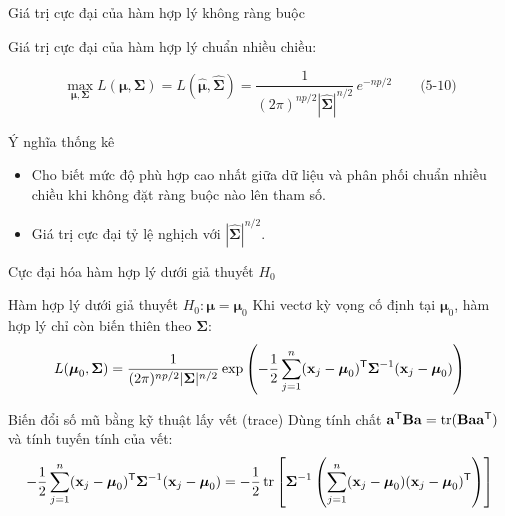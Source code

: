 \begin{frame}{Giá trị cực đại của hàm hợp lý không ràng buộc}

  \begin{alertblock}{Giá trị cực đại của hàm hợp lý chuẩn nhiều chiều:}

    \[
      \max_{\boldsymbol{\mu}, \boldsymbol{\Sigma}}
      L(\boldsymbol{\mu}, \boldsymbol{\Sigma})
      =
      L(\hat{\boldsymbol{\mu}}, \hat{\boldsymbol{\Sigma}})
      =
      \frac{1}{(2\pi)^{np/2} |\hat{\boldsymbol{\Sigma}}|^{n/2}}
      \, e^{-np/2}
      \qquad \text{(5-10)}
    \]

  \end{alertblock}

  \begin{block}{Ý nghĩa thống kê}
    \begin{itemize}
      \item Cho biết mức độ phù hợp cao nhất giữa dữ liệu và phân phối chuẩn nhiều chiều khi không đặt ràng buộc nào lên tham số.
      \item Giá trị cực đại tỷ lệ nghịch với $|\hat{\boldsymbol{\Sigma}}|^{n/2}$.
    \end{itemize}
  \end{block}
\end{frame}

\begin{frame}{Cực đại hóa hàm hợp lý dưới giả thuyết \texorpdfstring{$H_0$}{H0}}
  \begin{block}{Hàm hợp lý dưới giả thuyết $H_0: \boldsymbol{\mu} = \boldsymbol{\mu}_0$}
    Khi vectơ kỳ vọng cố định tại $\boldsymbol{\mu}_0$, hàm hợp lý chỉ còn biến thiên theo $\boldsymbol{\Sigma}$:
    \[
      L(\boldsymbol{\mu}_0, \boldsymbol{\Sigma}) = \frac{1}{(2\pi)^{np/2}|\boldsymbol{\Sigma}|^{n/2}} \exp\left( -\frac{1}{2} \sum_{j=1}^n (\mathbf{x}_j - \boldsymbol{\mu}_0)^{\mathsf T} \boldsymbol{\Sigma}^{-1} (\mathbf{x}_j - \boldsymbol{\mu}_0) \right)
    \]
  \end{block}

  \begin{exampleblock}{Biến đổi số mũ bằng kỹ thuật lấy vết (trace)}
    Dùng tính chất $\mathbf{a}^{\mathsf T}\mathbf{B}\mathbf{a} = \operatorname{tr}(\mathbf{B}\mathbf{a}\mathbf{a}^{\mathsf T})$ và tính tuyến tính của vết:
    \[
      -\frac{1}{2} \sum_{j=1}^n (\mathbf{x}_j - \boldsymbol{\mu}_0)^{\mathsf T} \boldsymbol{\Sigma}^{-1} (\mathbf{x}_j - \boldsymbol{\mu}_0)
      = -\frac{1}{2} \operatorname{tr}\left[ \boldsymbol{\Sigma}^{-1} \left( \sum_{j=1}^n (\mathbf{x}_j - \boldsymbol{\mu}_0)(\mathbf{x}_j - \boldsymbol{\mu}_0)^{\mathsf T} \right) \right]
    \]
  \end{exampleblock}
\end{frame}

